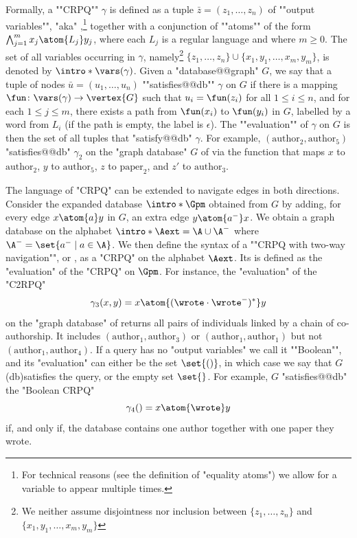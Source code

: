 \AP Formally, a ""CRPQ"" $\gamma$ is defined as a tuple $\bar z = (z_1,\hdots,z_n)$
of ""output variables"", "aka" ,\footnote{For technical reasons (see the definition of "equality atoms") we allow for a variable to appear multiple times.}
together with a conjunction of ""atoms"" of the form
$\bigwedge_{j=1}^m x_j \atom{L_j} y_j$, where each $L_j$ is a regular language and where $m \geq 0$.
The set of all variables occurring in $\gamma$, namely\footnote{We neither assume 
disjointness nor inclusion between $\{z_1,\hdots,z_n\}$ and $\{x_1,y_1,\hdots,x_m,y_m\}$}
$\{z_1,\hdots,z_n\}\cup\{x_1,y_1,\hdots,x_m,y_m\}$, is denoted by
$\intro*\vars(\gamma)$.
Given a "database@@graph" $G$, we say that a tuple of nodes $\bar u = (u_1,\hdots,u_n)$
\AP""satisfies@@db"" $\gamma$ 
on $G$ if there is a mapping
$\fun\colon \vars(\gamma) \to \vertex{G}$ such that $u_i = \fun(z_i)$ for all
$1 \leq i \leq n$, and for each $1 \leq j \leq m$,
there exists a path from $\fun(x_i)$ to $\fun(y_i)$ in $G$, labelled by
a word from $L_i$ (if the path is empty, the label is $\epsilon$). The \AP""evaluation"" of $\gamma$ on $G$ is then the set of all tuples that "satisfy@@db" $\gamma$.
%
For example, $(\text{author}_2, \text{author}_5)$ "satisfies@@db" $\gamma_2$ 
on the "graph database" $G$ of  via
the function that maps $x$ to $\text{author}_2$, $y$ to $\text{author}_5$,
$z$ to $\text{paper}_2$, and $z'$ to $\text{author}_3$.

\AP
The language of "CRPQ" can be extended to navigate edges in both directions. 
Consider the expanded database $\intro*\Gpm$ obtained from $G$ by 
adding, for every edge $x \atom{a} y$ in $G$, an extra edge $y \atom{a^-} x$.
We obtain a graph database on the alphabet $\intro*\Aext = \A \cup \A^-$ where
$\A^- = \set{a^- \mid a \in \A}$. We then define the syntax of
a \AP""CRPQ with two-way navigation"", or , as a "CRPQ" on the alphabet $\Aext$.
Its  is defined as the "evaluation" of the "CRPQ" on $\Gpm$.
For instance, the "evaluation" of the "C2RPQ"
\[
    \gamma_3(x, y) = x \atom{({\wrote}\cdot{\wrote}^-)^*} y
\]
on the "graph database" of  returns all pairs of
individuals linked by a chain of co-authorship.
It includes $(\text{author}_1, \text{author}_3)$ or $(\text{author}_1, \text{author}_1)$
but not $(\text{author}_1, \text{author}_4)$.
%
\AP If a query has no "output variables" we call it ""Boolean"", and
its "evaluation" can either be the set $\set{()}$, in which case we say that $G$
\reintro(db){satisfies} the query, or the empty set $\set{}$. For example, $G$ "satisfies@@db" the
"Boolean CRPQ"
\[\gamma_4() = x \atom{\wrote} y\]
if, and only if, the database contains one author together with one paper they wrote.

